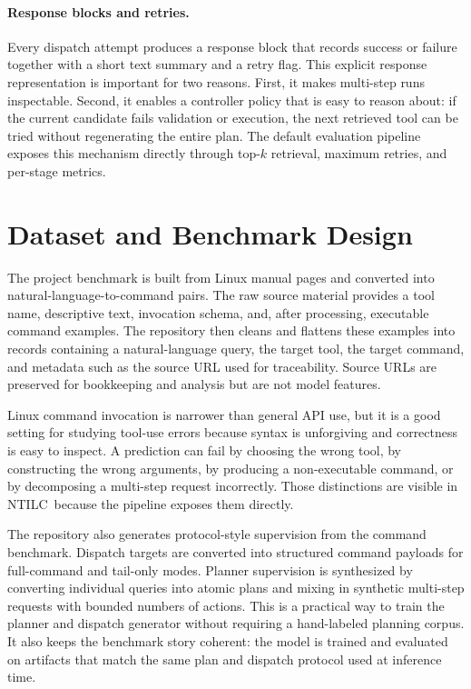 \documentclass[10pt,twocolumn,letterpaper]{article}
\newcommand{\method}{NTILC}
\begin{document}
\paragraph{Response blocks and retries.}
Every dispatch attempt produces a response block that records success or failure together with a short text summary and a retry flag. This explicit response representation is important for two reasons. First, it makes multi-step runs inspectable. Second, it enables a controller policy that is easy to reason about: if the current candidate fails validation or execution, the next retrieved tool can be tried without regenerating the entire plan. The default evaluation pipeline exposes this mechanism directly through top-$k$ retrieval, maximum retries, and per-stage metrics.

\section{Dataset and Benchmark Design}
The project benchmark is built from Linux manual pages and converted into natural-language-to-command pairs. The raw source material provides a tool name, descriptive text, invocation schema, and, after processing, executable command examples. The repository then cleans and flattens these examples into records containing a natural-language query, the target tool, the target command, and metadata such as the source URL used for traceability. Source URLs are preserved for bookkeeping and analysis but are not model features.

Linux command invocation is narrower than general API use, but it is a good setting for studying tool-use errors because syntax is unforgiving and correctness is easy to inspect. A prediction can fail by choosing the wrong tool, by constructing the wrong arguments, by producing a non-executable command, or by decomposing a multi-step request incorrectly. Those distinctions are visible in \method\ because the pipeline exposes them directly.

The repository also generates protocol-style supervision from the command benchmark. Dispatch targets are converted into structured command payloads for full-command and tail-only modes. Planner supervision is synthesized by converting individual queries into atomic plans and mixing in synthetic multi-step requests with bounded numbers of actions. This is a practical way to train the planner and dispatch generator without requiring a hand-labeled planning corpus. It also keeps the benchmark story coherent: the model is trained and evaluated on artifacts that match the same plan and dispatch protocol used at inference time.
\end{document}
